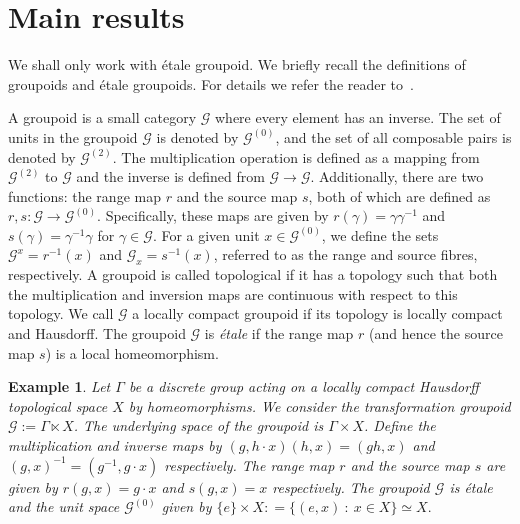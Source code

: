 \documentclass[a4paper,11pt,reqno]{amsart}
\theoremstyle{plain}
\newtheorem{defn}[thm]{Definition}
\newtheorem{ex}[thm]{Example}
\theoremstyle{named}
\numberwithin{equation}{section}
\begin{document}
			
			
			  
			\section{Main results}
			
			We shall only work with {\'e}tale groupoid. We briefly recall the definitions of groupoids and {\'e}tale groupoids. For details we refer the reader to~\cite{renault2006groupoid,sims2020operator,williams2019tool,brownc}.
			
			A groupoid is a small category \(\mathcal{G}\) where every element has an inverse. The set of
			units in the groupoid \(\mathcal{G}\) is denoted by \(\mathcal{G}^{(0)}\), and the set of all composable pairs is
			denoted by \(\mathcal{G}^{(2)}\). The multiplication operation is defined as a mapping from \(\mathcal{G}^{(2)}\) to
			\(\mathcal{G}\) and the inverse is defined from \(\mathcal{G}\to \mathcal{G}\). 
			Additionally, there are two functions: the range map \(r\) and the source map \(s\), both of which are defined as \(r, s \colon \mathcal{G} \to \mathcal{G}^{(0)}\). Specifically, these maps are given by \(r(\gamma) = \gamma \gamma^{-1}\) and \(s(\gamma) = \gamma^{-1} \gamma\) for \(\gamma \in \mathcal{G}\).
			For a given unit \(x \in \mathcal{G}^{(0)}\), we define the sets \(\mathcal{G}^x = r^{-1}(x)\) and \(\mathcal{G}_x = s^{-1}(x)\), referred to as the range and source fibres, respectively.
			A groupoid is called topological if it has a topology such that both the multiplication
			and inversion maps are continuous with respect to this topology. We call \(\mathcal{G}\)
			a locally compact groupoid if its topology is locally compact and Hausdorff. The
			groupoid \(\mathcal{G}\) is \emph{{\'e}tale} if the range map \(r\) (and hence the source map \(s\)) is a local homeomorphism.
			
			
			\begin{ex}\label{ex2}%
				Let $\Gamma$ be a discrete group acting on a locally compact Hausdorff topological space $X$ by homeomorphisms. We consider the transformation groupoid $\mathcal G := \Gamma \ltimes X$. The underlying space of the groupoid is \(\Gamma \times X\). Define the multiplication and inverse maps by $(g, h \cdot x) (h, x) = (gh, x)$ and $(g, x)^{-1} = (g^{-1}, g \cdot x)$ respectively.
				The range map $r$ and the source map $s$ are given by $r(g,x) = g \cdot x$ and $s(g,x) = x$ respectively. The groupoid $\mathcal G$ is étale and the unit space $\mathcal G^{(0)}$ given by $\{e\} \times X : = \{(e,x)\ :\ x \in X\} \simeq X.$
			\end{ex}
			
\end{document}
